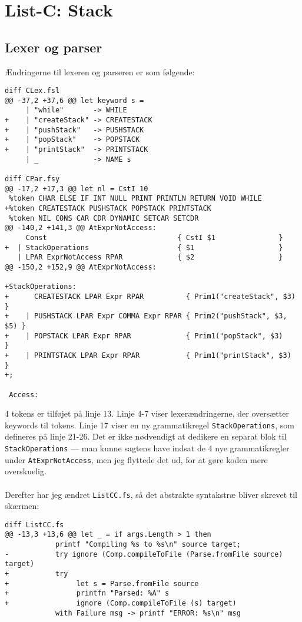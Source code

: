 \section{List-C: Stack}

\subsection{Lexer og parser}

Ændringerne til lexeren og parseren er som følgende:

\begin{verbatim}
diff CLex.fsl
@@ -37,2 +37,6 @@ let keyword s =
     | "while"       -> WHILE         
+    | "createStack" -> CREATESTACK
+    | "pushStack"   -> PUSHSTACK
+    | "popStack"    -> POPSTACK
+    | "printStack"  -> PRINTSTACK
     | _             -> NAME s

diff CPar.fsy
@@ -17,2 +17,3 @@ let nl = CstI 10
 %token CHAR ELSE IF INT NULL PRINT PRINTLN RETURN VOID WHILE
+%token CREATESTACK PUSHSTACK POPSTACK PRINTSTACK
 %token NIL CONS CAR CDR DYNAMIC SETCAR SETCDR
@@ -140,2 +141,3 @@ AtExprNotAccess:
     Const                               { CstI $1               }
+  | StackOperations                     { $1                    }
   | LPAR ExprNotAccess RPAR             { $2                    } 
@@ -150,2 +152,9 @@ AtExprNotAccess:
 
+StackOperations:
+      CREATESTACK LPAR Expr RPAR          { Prim1("createStack", $3)   }
+    | PUSHSTACK LPAR Expr COMMA Expr RPAR { Prim2("pushStack", $3, $5) }
+    | POPSTACK LPAR Expr RPAR             { Prim1("popStack", $3)      }
+    | PRINTSTACK LPAR Expr RPAR           { Prim1("printStack", $3)    }
+;

 Access:
\end{verbatim}

4 tokens er tilføjet på linje 13. Linje 4-7 viser lexerændringerne, der oversætter keywords til tokens. Linje 17 viser en ny grammatikregel \texttt{StackOperations}, som defineres på linje 21-26. Det er ikke nødvendigt at dedikere en separat blok til \texttt{StackOperations} --- man kunne sagtens have indsat de 4 nye grammatikregler under \texttt{AtExprNotAccess}, men jeg flyttede det ud, for at gøre koden mere overskuelig.
\\\\
Derefter har jeg ændret \texttt{ListCC.fs}, så det abstrakte syntakstræ bliver skrevet til skærmen:

\begin{verbatim}
diff ListCC.fs
@@ -13,3 +13,6 @@ let _ = if args.Length > 1 then
            printf "Compiling %s to %s\n" source target;
-           try ignore (Comp.compileToFile (Parse.fromFile source) target)
+           try
+                let s = Parse.fromFile source
+                printfn "Parsed: %A" s
+                ignore (Comp.compileToFile (s) target)
            with Failure msg -> printf "ERROR: %s\n" msg
\end{verbatim}


